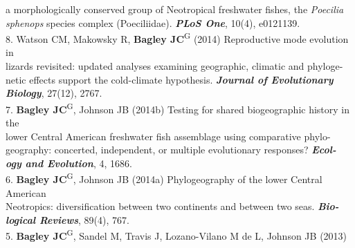 \documentclass[margin,line]{res}
\begin{document}
\begin{resume}
\hspace*{8mm} a morphologically conserved group of Neotropical freshwater fishes, the \emph{Poecilia}\\ \vspace{2mm}
\hspace*{8mm} \emph{sphenops} species complex (Poeciliidae). {\it \textbf{PLoS One}}, 10(4), e0121139. \\
8. Watson CM, Makowsky R, \textbf{Bagley JC}\textsuperscript{G} (2014) Reproductive mode evolution in\\ 
\hspace*{8mm} lizards revisited: updated analyses examining geographic, climatic and phyloge-\\
\hspace*{8mm} netic effects support the cold-climate hypothesis. {\it \textbf{Journal of Evolutionary}\\ \vspace{2mm}
\hspace*{8mm}\textbf{Biology}}, 27(12), 2767. \\
7. \textbf{Bagley JC}\textsuperscript{G}, Johnson JB (2014b) Testing for shared biogeographic history in the\\
\hspace*{8mm} lower Central American freshwater fish assemblage using comparative phylo-\\
\hspace*{8mm} geography: concerted, independent, or multiple evolutionary responses? {\it \textbf{Ecol-}\\ \vspace{2mm}
\hspace*{8mm}\textbf{ogy and Evolution}}, 4, 1686. \\
6. \textbf{Bagley JC}\textsuperscript{G}, Johnson JB (2014a) Phylogeography of the lower Central American\\
\hspace*{8mm} Neotropics: diversification between two continents and between two seas. {\it \textbf{Bio-}\\ \vspace{2mm}
\hspace*{8mm}\textbf{logical Reviews}}, 89(4), 767. \\
5. \textbf{Bagley JC}\textsuperscript{G}, Sandel M, Travis J, Lozano-Vilano M de L, Johnson JB (2013)\\

\end{resume}
\end{document}
